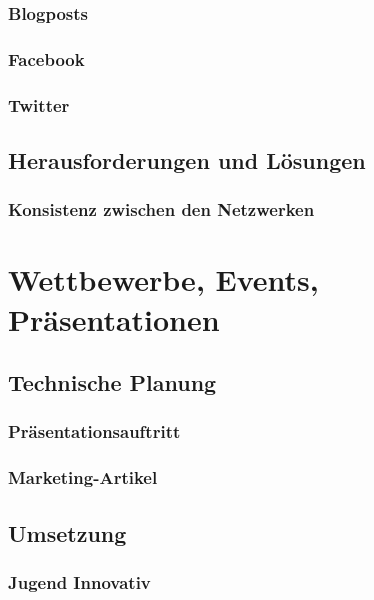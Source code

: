    \subsubsection{Blogposts}

    \subsubsection{Facebook}

    \subsubsection{Twitter}

  \subsection{Herausforderungen und Lösungen}

    \subsubsection{Konsistenz zwischen den Netzwerken}

\section{Wettbewerbe, Events, Präsentationen}

  \subsection{Technische Planung}

    \subsubsection{Präsentationsauftritt}

    \subsubsection{Marketing-Artikel}

  \subsection{Umsetzung}

    \subsubsection{Jugend Innovativ}

